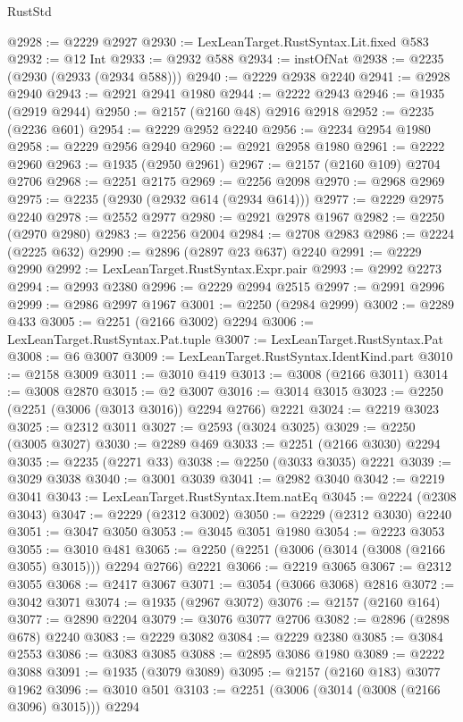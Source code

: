\begin{lexlean}{RustStd}
\begin{coremodule}
{\begin{coremodule}
{{{{{{{{{{{{{{{{{{{{{{{{{{{{{{{{{{{{{{{{{{{{{{{{{{{{{@2928 := @2229 @2927
@2930 := LexLeanTarget.RustSyntax.Lit.fixed @583
@2932 := @12 Int
@2933 := @2932 @588
@2934 := instOfNat
@2938 := @2235 (@2930 (@2933 (@2934 @588)))
@2940 := @2229 @2938 @2240
@2941 := @2928 @2940
@2943 := @2921 @2941 @1980
@2944 := @2222 @2943
@2946 := @1935 (@2919 @2944)
@2950 := @2157 (@2160 @48) @2916 @2918
@2952 := @2235 (@2236 @601)
@2954 := @2229 @2952 @2240
@2956 := @2234 @2954 @1980
@2958 := @2229 @2956 @2940
@2960 := @2921 @2958 @1980
@2961 := @2222 @2960
@2963 := @1935 (@2950 @2961)
@2967 := @2157 (@2160 @109) @2704 @2706
@2968 := @2251 @2175
@2969 := @2256 @2098
@2970 := @2968 @2969
@2975 := @2235 (@2930 (@2932 @614 (@2934 @614)))
@2977 := @2229 @2975 @2240
@2978 := @2552 @2977
@2980 := @2921 @2978 @1967
@2982 := @2250 (@2970 @2980)
@2983 := @2256 @2004
@2984 := @2708 @2983
@2986 := @2224 (@2225 @632)
@2990 := @2896 (@2897 @23 @637) @2240
@2991 := @2229 @2990
@2992 := LexLeanTarget.RustSyntax.Expr.pair
@2993 := @2992 @2273
@2994 := @2993 @2380
@2996 := @2229 @2994 @2515
@2997 := @2991 @2996
@2999 := @2986 @2997 @1967
@3001 := @2250 (@2984 @2999)
@3002 := @2289 @433
@3005 := @2251 (@2166 @3002) @2294
@3006 := LexLeanTarget.RustSyntax.Pat.tuple
@3007 := LexLeanTarget.RustSyntax.Pat
@3008 := @6 @3007
@3009 := LexLeanTarget.RustSyntax.IdentKind.part
@3010 := @2158 @3009
@3011 := @3010 @419
@3013 := @3008 (@2166 @3011)
@3014 := @3008 @2870
@3015 := @2 @3007
@3016 := @3014 @3015
@3023 := @2250 (@2251 (@3006 (@3013 @3016)) @2294 @2766) @2221
@3024 := @2219 @3023
@3025 := @2312 @3011
@3027 := @2593 (@3024 @3025)
@3029 := @2250 (@3005 @3027)
@3030 := @2289 @469
@3033 := @2251 (@2166 @3030) @2294
@3035 := @2235 (@2271 @33)
@3038 := @2250 (@3033 @3035) @2221
@3039 := @3029 @3038
@3040 := @3001 @3039
@3041 := @2982 @3040
@3042 := @2219 @3041
@3043 := LexLeanTarget.RustSyntax.Item.natEq
@3045 := @2224 (@2308 @3043)
@3047 := @2229 (@2312 @3002)
@3050 := @2229 (@2312 @3030) @2240
@3051 := @3047 @3050
@3053 := @3045 @3051 @1980
@3054 := @2223 @3053
@3055 := @3010 @481
@3065 := @2250 (@2251 (@3006 (@3014 (@3008 (@2166 @3055) @3015))) @2294 @2766) @2221
@3066 := @2219 @3065
@3067 := @2312 @3055
@3068 := @2417 @3067
@3071 := @3054 (@3066 @3068) @2816
@3072 := @3042 @3071
@3074 := @1935 (@2967 @3072)
@3076 := @2157 (@2160 @164)
@3077 := @2890 @2204
@3079 := @3076 @3077 @2706
@3082 := @2896 (@2898 @678) @2240
@3083 := @2229 @3082
@3084 := @2229 @2380
@3085 := @3084 @2553
@3086 := @3083 @3085
@3088 := @2895 @3086 @1980
@3089 := @2222 @3088
@3091 := @1935 (@3079 @3089)
@3095 := @2157 (@2160 @183) @3077 @1962
@3096 := @3010 @501
@3103 := @2251 (@3006 (@3014 (@3008 (@2166 @3096) @3015))) @2294
}}}}}}}}}}}}}}}}}}}}}}}}}}}}}}}}}}}}}}}}}}}}}}}}}}}}}
\end{coremodule}}
\end{coremodule}
\end{lexlean}
